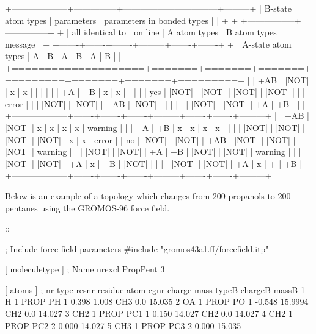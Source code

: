            +--------------------+---------------+---------------------------------+---------+
           | B-state atom types | parameters    | parameters in bonded types      |         |
           +                    +               +-----------------+---------------+         +
           | all identical to   | on line       | A atom types    | B atom types  | message |
           +                    +-------+-------+-------+---------+-------+-------+         +
           | A-state atom types | A     | B     | A     | B       | A     | B     |         |
           +====================+=======+=======+=======+=========+=======+=======+=========+
           |                    | +AB   | |NOT| | x     | x       |       |       |         |
           |                    | +A    | +B    | x     | x       |       |       |         |
           | yes                | |NOT| | |NOT| | |NOT| | |NOT|   |       |       | error   |
           |                    | |NOT| | |NOT| | +AB   | |NOT|   |       |       |         |
           |                    | |NOT| | |NOT| | +A    | +B      |       |       |         |
           +--------------------+-------+-------+-------+---------+-------+-------+---------+
           |                    | +AB   | |NOT| | x     | x       | x     | x     | warning |
           |                    | +A    | +B    | x     | x       | x     | x     |         |
           |                    | |NOT| | |NOT| | |NOT| | |NOT|   | x     | x     | error   |
           | no                 | |NOT| | |NOT| | +AB   | |NOT|   | |NOT| | |NOT| | warning |
           |                    | |NOT| | |NOT| | +A    | +B      | |NOT| | |NOT| | warning |
           |                    | |NOT| | |NOT| | +A    | x       | +B    | |NOT| |         |
           |                    | |NOT| | |NOT| | +A    | x       | +     | +B    |         |
           +--------------------+-------+-------+-------+---------+-------+-------+---------+



Below is an example of a topology which changes from 200 propanols to
200 pentanes using the GROMOS-96 force field.

::

     
    ; Include force field parameters
    #include "gromos43a1.ff/forcefield.itp"

    [ moleculetype ]
    ; Name            nrexcl
    PropPent          3

    [ atoms ]
    ; nr type resnr residue atom cgnr  charge    mass  typeB chargeB  massB
      1    H    1     PROP    PH    1   0.398    1.008  CH3     0.0  15.035
      2   OA    1     PROP    PO    1  -0.548  15.9994  CH2     0.0  14.027
      3  CH2    1     PROP   PC1    1   0.150   14.027  CH2     0.0  14.027
      4  CH2    1     PROP   PC2    2   0.000   14.027
      5  CH3    1     PROP   PC3    2   0.000   15.035

